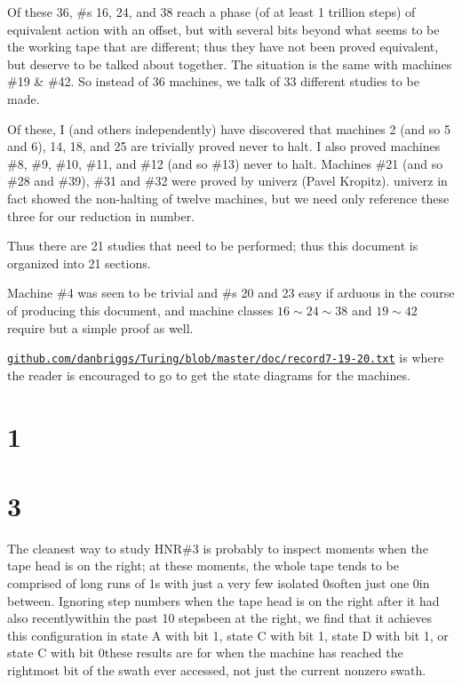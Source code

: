 \documentclass[12pt]{article}
\begin{document}
Of these 36, \#s 16, 24, and 38 reach a phase (of at least 1 trillion steps) of equivalent action with an offset, but with several bits beyond what seems to be the working tape that are different; thus they have not been proved equivalent, but deserve to be talked about together. The situation is the same with machines \#19 \& \#42. So instead of 36 machines, we talk of 33 different studies to be made.

Of these, I (and others independently) have discovered that machines 2 (and so 5 and 6), 14, 18, and 25 are trivially proved never to halt. I also proved machines \#8, \#9, \#10, \#11, and \#12 (and so \#13) never to halt. Machines \#21 (and so \#28 and \#39), \#31 and \#32 were proved by univerz (Pavel Kropitz). univerz in fact showed the non-halting of twelve machines, but we need only reference these three for our reduction in number.

Thus there are 21 studies that need to be performed; thus this document is organized into 21 sections.

Machine \#4 was seen to be trivial and \#s 20 and 23 easy if arduous in the course of producing this document,
and machine classes $16\sim24\sim38$ and $19\sim42$ require but a simple proof as well.

\texttt{\href{https://github.com/danbriggs/Turing/blob/master/doc/record7-19-20.txt}
{github.com/danbriggs/Turing/blob/master/doc/record7-19-20.txt}}
is where the reader is encouraged to go to get the state diagrams for the machines.

\newpage
\tableofcontents
\clearpage
{}
{}
\section*{1}
\clearpage
{}
{}
\section*{3}
The cleanest way to study HNR\#3 is probably to inspect moments when the tape head is on the right; at these moments, the whole tape tends to be comprised of long runs of 1s with just a very few isolated 0s\textemdash often just one 0\textemdash in between. Ignoring step numbers when the tape head is on the right after it had also recently\textemdash within the past 10 steps\textemdash been at the right, we find that it achieves this configuration in state A with bit 1, state C with bit 1, state D with bit 1, or state C with bit 0\textemdash these results are for when the machine has reached the rightmost bit of the swath ever accessed, not just the current nonzero swath.
\end{document}
